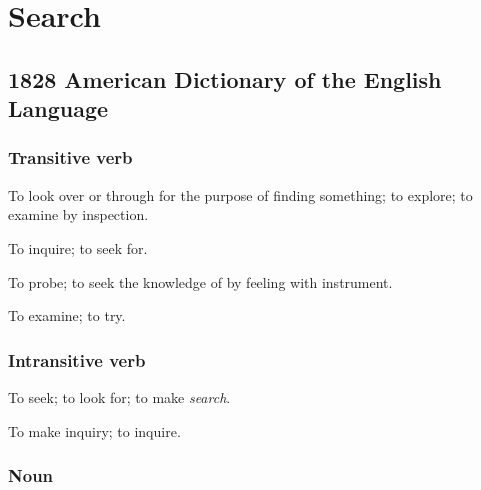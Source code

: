 \section{Search}
	\label{SEARCH}
	

\subsection{1828 American Dictionary of the English Language} %
	\label{SEARCH-1828}
	
	\subsubsection{Transitive verb}

		\begin{compactitem}
			\item[1] To look over or through for the purpose of finding something; to explore; to examine by inspection.
			\item[2]  To inquire; to seek for.
			\item[3] To probe; to seek the knowledge of by feeling with instrument.
			\item[4] To examine; to try.
		\end{compactitem}
		
	\subsubsection{Intransitive verb}
	
		\begin{compactitem}
			\item[1] To seek; to look for; to make \textit{search}.
			\item[2] To make inquiry; to inquire.
		\end{compactitem}
		
	\subsubsection{Noun}
	
